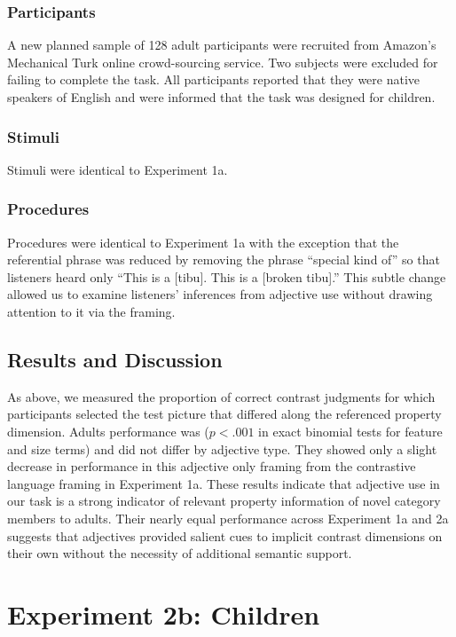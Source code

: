 \documentclass[10pt,letterpaper]{article}
\begin{document}
\subsubsection{Participants}

A new planned sample of 128 adult participants were recruited from Amazon's Mechanical Turk online crowd-sourcing service.  Two subjects were excluded for failing to complete the task. All participants reported that they were native speakers of English and were informed that the task was designed for children.  

\subsubsection{Stimuli}

Stimuli were identical to Experiment 1a. 

\subsubsection{Procedures}

Procedures were identical to Experiment 1a with the exception that the referential phrase was reduced by removing the phrase ``special kind of'' so that listeners heard only ``This is a [tibu]. This is a [broken tibu].''   This subtle change allowed us to examine listeners' inferences from adjective use without drawing attention to it via the framing.  

\subsection{Results and Discussion}

As above, we measured the proportion of correct contrast judgments for which participants selected the test picture that differed along the referenced property dimension.  Adults performance was ($p < .001$ in exact binomial tests for feature and size terms) and did not differ by adjective type.  They showed only a slight decrease in performance in this adjective only framing from the contrastive language framing in Experiment 1a.  These results indicate that adjective use in our task is a strong indicator of relevant property information of novel category members to adults.  Their nearly equal performance across Experiment 1a and 2a suggests that adjectives provided salient cues to implicit contrast dimensions on their own without the necessity of additional semantic support. 

\section{Experiment 2b: Children} 
\end{document}
